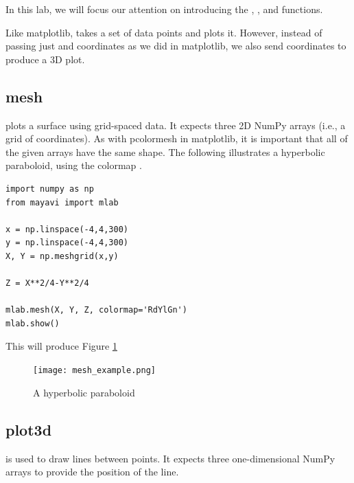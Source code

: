 In this lab, we will focus our attention on introducing the , , and  functions.

Like matplotlib,  takes a set of data points and plots it.
However, instead of passing just  and  coordinates as we did in matplotlib, we also send  coordinates to produce a 3D plot.

\subsection*{mesh}
 plots a surface using grid-spaced data.
It expects three 2D NumPy arrays (i.e., a grid of  coordinates).
As with pcolormesh in matplotlib, it is important that all of the given arrays have the same shape.
The following illustrates a hyperbolic paraboloid, using the colormap .
\begin{lstlisting}
import numpy as np
from mayavi import mlab

x = np.linspace(-4,4,300)
y = np.linspace(-4,4,300)
X, Y = np.meshgrid(x,y)

Z = X**2/4-Y**2/4

mlab.mesh(X, Y, Z, colormap='RdYlGn')
mlab.show()
\end{lstlisting}

This will produce Figure \ref{fig:mesh_example}
\begin{figure}
\texttt{[image: mesh\_example.png]}
\caption{A hyperbolic paraboloid}
\label{fig:mesh_example}
\end{figure}

\subsection*{plot3d}
 is used to draw lines between points.
It expects three one-dimensional NumPy arrays to provide the position of the line.


